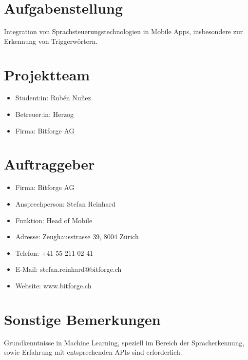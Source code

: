 \documentclass[11pt,a4paper]{article}
\newcommand\blankpage{
	\null
	\thispagestyle{empty}
	\addtocounter{page}{-1}
	\newpage}
\begin{document}


\newpage
\pagecolor{ba-gray}
\afterpage{\nopagecolor}
\blankpage

\newpage

\section*{Aufgabenstellung}
Integration von Sprachsteuerungstechnologien in Mobile Apps, insbesondere zur Erkennung
von Triggerwörtern.

\section*{Projektteam}
\begin{itemize}
	\item Student:in: Rubén Nuñez
	\item Betreuer:in: Herzog
	\item Firma: Bitforge AG
\end{itemize}

\section*{Auftraggeber}
\begin{itemize}
	\item Firma: Bitforge AG
	\item Ansprechperson: Stefan Reinhard
	\item Funktion: Head of Mobile
	\item Adresse: Zeughausstrasse 39, 8004 Zürich
	\item Telefon: +41 55 211 02 41
	\item E-Mail: stefan.reinhard@bitforge.ch
	\item Website: www.bitforge.ch
\end{itemize}

\section*{Sonstige Bemerkungen}
Grundkenntnisse in Machine Learning, speziell im Bereich der Spracherkennung, sowie
Erfahrung mit entsprechenden APIs sind erforderlich.
\end{document}
